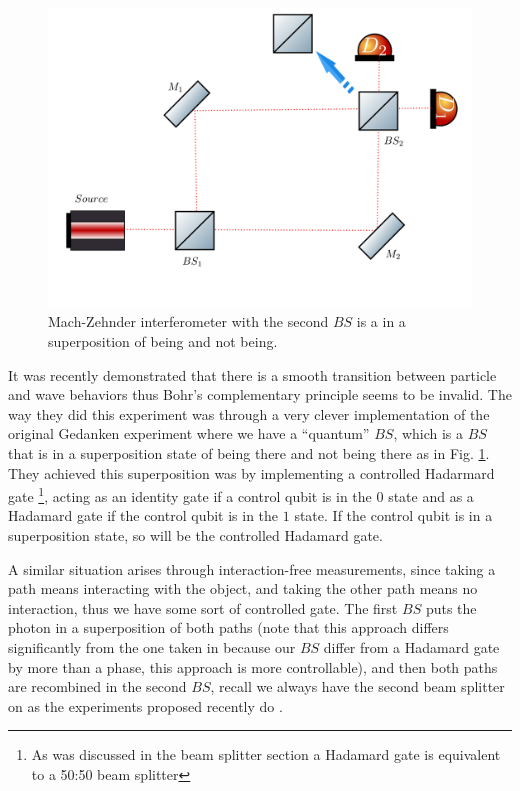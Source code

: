 \documentclass[12pt]{book}
\begin{document}
\begin{figure}[H]
\centering
\includegraphics[width=\linewidth,height=7.5 cm]{images/wheeler3.png}
\caption{Mach-Zehnder interferometer with the second $BS$ is a in a superposition of being and not being.}
\label{wheeler3}
\end{figure}

It was recently demonstrated \cite{Peruzzo, Kaiser2012} that there is a smooth transition between particle and wave behaviors thus Bohr's complementary principle seems to be invalid. The way they did this experiment was through a very clever implementation of the original Gedanken experiment where we have a ``quantum'' $BS$, which is a $BS$ that is in a superposition state of being there and not being there as in Fig. \ref{wheeler3}. They achieved this superposition was by implementing a controlled Hadarmard gate \footnote{As was discussed in the beam splitter section a Hadamard gate is equivalent to a 50:50 beam splitter}, acting as an identity gate if a control qubit is in the $0$ state and as a Hadamard gate if the control qubit is in the $1$ state.  If the control qubit is in a superposition state, so will be the controlled Hadamard gate.




A similar situation arises through interaction-free measurements, since taking a path means interacting with the object, and taking the other path means no interaction, thus we have some sort of controlled gate. The first $BS$ puts the photon in a superposition of both paths (note that this approach differs significantly from the one taken in \cite{Peruzzo,Kaiser2012} because our $BS$ differ from a Hadamard gate by more than a phase, this approach is more controllable), and then both paths are recombined in the second $BS$, recall we always have the second beam splitter on as the experiments proposed recently do \cite{Polino}.
\end{document}
